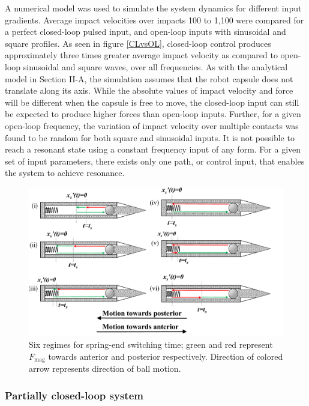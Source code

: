 \documentclass[letterpaper, 10 pt, journal, twoside]{ieeetran}
\begin{document}
A numerical model was used to simulate the system dynamics for different input gradients. Average impact velocities over impacts 100 to 1,100 were compared for a perfect closed-loop pulsed input, and open-loop inputs with sinusoidal and square profiles. As seen in figure \ref{CLvsOL}, closed-loop control produces approximately three times greater average impact velocity as compared to open-loop sinusoidal and square waves, over all frequencies. As with the analytical model in Section II-A, the simulation assumes that the robot capsule does not translate along its axis. While the absolute values of impact velocity and force will be different when the capsule is free to move, the closed-loop input can still be expected to produce higher forces than open-loop inputs. Further, for a given open-loop frequency, the variation of impact velocity over multiple contacts was found to be random for both square and sinusoidal inputs. It is not possible to reach a resonant state using a constant frequency input of any form. For a given set of input parameters, there exists only one path, or control input, that enables the system to achieve resonance. 
\begin{figure}
	\includegraphics[width=\linewidth]{Tswitchcases.pdf}
	\caption{Six regimes for spring-end switching time; green and red represent $F_{\textrm{mag}}$ towards anterior and posterior respectively. Direction of colored arrow represents direction of ball motion.}
	\label{Tswitch}
	\vspace{-2em}
\end{figure}


\subsubsection{Partially closed-loop system}
\label{pcl}
\end{document}
